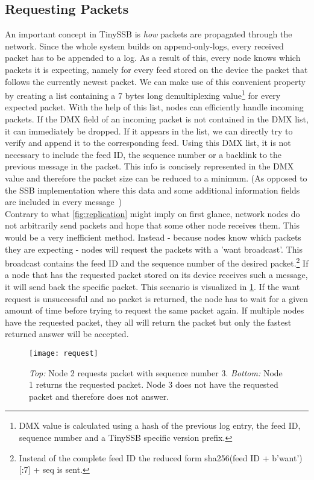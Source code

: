 \subsection{Requesting Packets}
An important concept in TinySSB is \textit{how} packets are propagated through the network. Since the whole system builds on append-only-logs, every received packet has to be appended to a log. As a result of this, every node knows which packets it is expecting, namely for every feed stored on the device the packet that follows the currently newest packet. We can make use of this convenient property by creating a list containing a 7 bytes long demultiplexing value\footnote{DMX value is calculated using a hash of the previous log entry, the feed ID, sequence number and a TinySSB specific version prefix.} for every expected packet. With the help of this list, nodes can efficiently handle incoming packets. If the DMX field of an incoming packet is not contained in the DMX list, it can immediately be dropped. If it appears in the list, we can directly try to verify and append it to the corresponding feed. Using this DMX list, it is not necessary to include the feed ID, the sequence number or a backlink to the previous message in the packet. This info is concisely represented in the DMX value and therefore the packet size can be reduced to a minimum. (As opposed to the SSB implementation where this data and some additional information fields are included in every message~\cite{10.1145/3357150.3357396}) \\
Contrary to what \cref{fig:replication} might imply on first glance, network nodes do not arbitrarily send packets and hope that some other node receives them. This would be a very inefficient method. Instead - because nodes know which packets they are expecting - nodes will request the packets with a 'want broadcast'. This broadcast contains the feed ID and the sequence number of the desired packet.\footnote{Instead of the complete feed ID the reduced form sha256(feed ID + b'want')[:7] + seq is sent.} If a node that has the requested packet stored on its device receives such a message, it will send back the specific packet. This scenario is visualized in \cref{fig:request}. If the want request is unsuccessful and no packet is returned, the node has to wait for a given amount of time before trying to request the same packet again. If multiple nodes have the requested packet, they all will return the packet but only the fastest returned answer will be accepted.

\begin{figure}
\centering
\texttt{[image: request]}
\caption{\textit{Top:} Node 2 requests packet with sequence number 3. \textit{Bottom:} Node 1 returns the requested packet. Node 3 does not have the requested packet and therefore does not answer.}
\label{fig:request}
\end{figure}

